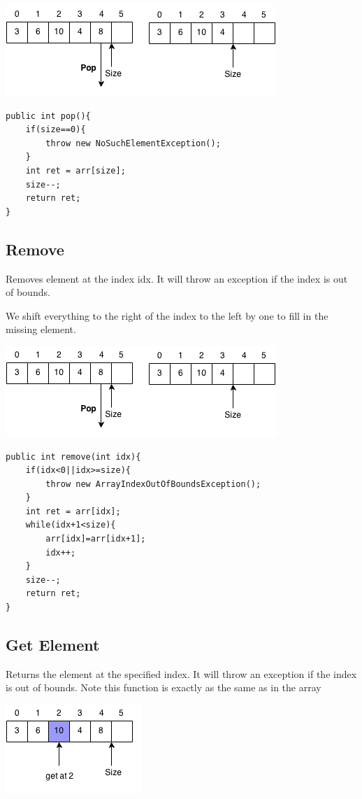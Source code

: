 \documentclass[11pt,oneside]{book}
\makeatletter
\def\maxwidth#1{\ifdim\Gin@nat@width>#1 #1\else\Gin@nat@width\fi}
\makeatother
\begin{document}
\includegraphics[width=\maxwidth{\textwidth}]{vector4.png}

\begin{lstlisting}
public int pop(){
    if(size==0){
        throw new NoSuchElementException();
    }
    int ret = arr[size];
    size--;
    return ret;
}
\end{lstlisting}

\subsection{Remove}

Removes element at the index idx. It will throw an exception if the index is out of bounds.

We shift everything to the right of the index to the left by one to fill in the missing element.

\includegraphics[width=\maxwidth{\textwidth}]{vector4.png}

\begin{lstlisting}
public int remove(int idx){
    if(idx<0||idx>=size){
        throw new ArrayIndexOutOfBoundsException();
    }
    int ret = arr[idx];
    while(idx+1<size){
        arr[idx]=arr[idx+1];
        idx++;
    }
    size--;
    return ret;
}
\end{lstlisting}

\subsection{Get Element}

Returns the element at the specified index. It will throw an exception if the index is out of bounds. Note this function is exactly as the same as in the array

\includegraphics[width=\maxwidth{\textwidth}]{vectorget.png}
\end{document}
